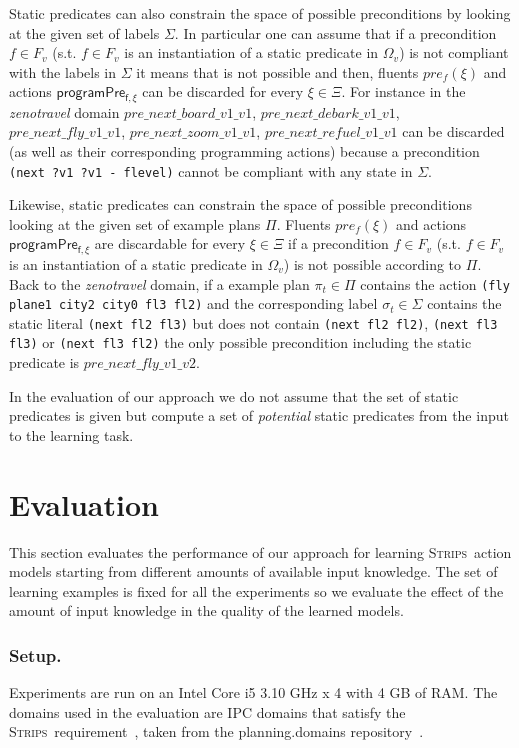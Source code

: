 \documentclass[letterpaper]{article} %
\newcommand{\strips}{\textsc{Strips}}     %
\begin{document}
Static predicates can also constrain the space of possible preconditions by looking at the given set of labels $\Sigma$. In particular one can assume that if a precondition $f\in F_v$ (s.t. $f\in F_v$ is an instantiation of a static predicate in $\Omega_v$) is not compliant with the labels in $\Sigma$ it means that is not possible and then, fluents $pre_f(\xi)$ and actions $\mathsf{programPre_{f,\xi}}$ can be discarded for every $\xi\in\Xi$. For instance in the {\em zenotravel} domain $pre\_next\_board\_v1\_v1$, $pre\_next\_debark\_v1\_v1$, $pre\_next\_fly\_v1\_v1$, $pre\_next\_zoom\_v1\_v1$, $pre\_next\_refuel\_v1\_v1$ can be discarded (as well as their corresponding programming actions) because a precondition {\tt\small(next ?v1 ?v1 - flevel)} cannot be compliant with any state in $\Sigma$.

Likewise, static predicates can constrain the space of possible preconditions looking at the given set of example plans $\Pi$. Fluents $pre_f(\xi)$ and actions $\mathsf{programPre_{f,\xi}}$ are discardable for every $\xi\in\Xi$ if a precondition $f\in F_v$ (s.t. $f\in F_v$ is an instantiation of a static predicate in $\Omega_v$) is not possible according to $\Pi$. Back to the {\em zenotravel} domain, if a example plan $\pi_t\in \Pi$ contains the action {\tt\small (fly plane1 city2 city0 fl3 fl2)} and the corresponding label $\sigma_t\in\Sigma$ contains the static literal {\tt\small (next fl2 fl3)} but does not contain {\tt\small (next fl2 fl2)}, {\tt\small (next fl3 fl3)} or {\tt\small (next fl3 fl2)} the only possible precondition including the static predicate is $pre\_next\_fly\_v1\_v2$.

In the evaluation of our approach we do not assume that the set of static predicates is given but compute a set of {\em potential} static predicates from the input to the learning task.


\section{Evaluation}
This section evaluates the performance of our approach for learning \strips\ action models starting from different amounts of available input knowledge. The set of learning examples is fixed for all the experiments so we evaluate the effect of the amount of input knowledge in the quality of the learned models. %

\subsubsection{Setup.}
Experiments are run on an Intel Core i5 3.10 GHz x 4 with 4 GB of RAM. The domains used in the evaluation are IPC domains that satisfy the \strips\ requirement~\cite{fox2003pddl2}, taken from the {\sc planning.domains} repository~\cite{muise2016planning}.
\end{document}
